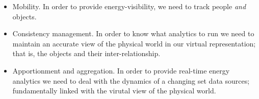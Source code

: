 \begin{itemize}
\item Mobility.  In order to provide energy-visibility, we need to track people \emph{and} objects.

\item Consistency management.  In order to know what analytics to run we need to maintain an accurate
		view of the physical world in our virtual representation; that is,
		the objects and their inter-relationship.

\item Apportionment and aggregation.  In order to provide real-time energy analytics we need to deal with the
		dynamics of a changing set data sources; fundamentally linked with the virutal view of the physical world.


\end{itemize}

\vspace{0.08in}


